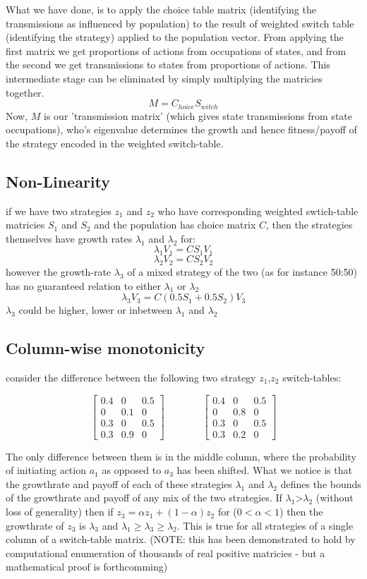 \documentclass[journal,article,accept,oneauthors,pdftex,10pt,a4paper]{mdpi}
\begin{document}
What we have done, is to apply the choice table matrix (identifying the transmissions as influenced by population) to the result of weighted switch table (identifying the strategy) applied to the population vector.
From applying the first matrix we get proportions of actions from occupations of states, and from the second we get transmissions to states from proportions of actions.
This intermediate stage can be eliminated by simply multiplying the matricies together.
$$ M = C_{hoice}S_{witch} $$
Now, $M$ is our 'transmission matrix' (which gives state transmissions from state occupations), who's eigenvalue determines the growth and hence fitness/payoff of the strategy encoded in the weighted switch-table.

\subsection{Non-Linearity}

if we have two strategies $z_1$ and $z_2$ who have corresponding weighted swtich-table matricies $S_1$ and $S_2$ and the population has choice matrix $C$, then the strategies themselves have growth rates $\lambda_1$ and $\lambda_2$ for:
$$\lambda_1V_1=CS_1V_1$$
$$\lambda_2V_2=CS_2V_2$$
however the growth-rate $\lambda_3$ of a mixed strategy of the two (as for instance 50:50) has no guaranteed relation to either $\lambda_1$ or $\lambda_2$
$$\lambda_3V_3=C(0.5S_1+0.5S_2)V_3$$
$\lambda_3$ could be higher, lower or inbetween $\lambda_1$ and $\lambda_2$

\subsection{Column-wise monotonicity}

consider the difference between the following two strategy $z_1$,$z_2$ switch-tables:

$$ \begin{bmatrix}
    0.4&0&0.5 \\
    0&0.1&0 \\
    0.3&0&0.5 \\
    0.3&0.9&0
\end{bmatrix}~~~~~~~~~~~~~~~~~\begin{bmatrix}
    0.4&0&0.5 \\
    0&0.8&0 \\
    0.3&0&0.5 \\
    0.3&0.2&0
\end{bmatrix}$$

The only difference between them is in the middle column, where the probability of initiating action $a_1$ as opposed to $a_3$ has been shifted.
What we notice is that the growthrate and payoff of each of these strategies $\lambda_1$ and $\lambda_2$ defines the bounds of the growthrate and payoff of any mix of the two strategies.
If $\lambda_1$>$\lambda_2$ (without loss of generality) then if $z_3=\alpha z_1+(1-\alpha) z_2$ for ($0<\alpha<1$) then the growthrate of $z_3$ is $\lambda_3$ and $\lambda_1\ge\lambda_3\ge\lambda_2$.
This is true for all strategies of a single column of a switch-table matrix.
(NOTE: this has been demonstrated to hold by computational enumeration of thousands of real positive matricies - but a mathematical proof is forthcomming)
\end{document}
